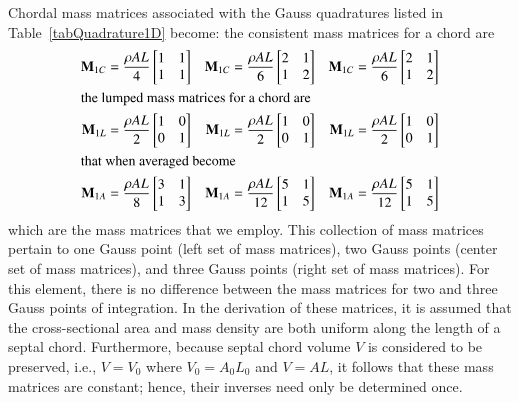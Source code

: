 Chordal mass matrices associated with the Gauss quadratures listed in Table~\ref{tabQuadrature1D} become: the consistent mass matrices for a chord are
\begin{subequations}
\label{massMatrices1D}
\begin{align}
    \mathbf{M}_{1C} & = \frac{\rho A L}{4} 
    \begin{bmatrix} 1 & 1 \\ 1 & 1 \end{bmatrix} & 
    \mathbf{M}_{1C} & = \frac{\rho A L}{6} 
    \begin{bmatrix} 2 & 1 \\ 1 & 2 \end{bmatrix} & 
    \mathbf{M}_{1C} & = \frac{\rho A L}{6} 
    \begin{bmatrix} 2 & 1 \\ 1 & 2 \end{bmatrix} 
    \label{ConsMassMatrix1D} \\
    \intertext{the lumped mass matrices for a chord are}
    \mathbf{M}_{1L} & = \frac{\rho A L}{2} 
    \begin{bmatrix} 1 & 0 \\ 0 & 1 \end{bmatrix} & 
    \mathbf{M}_{1L} & = \frac{\rho A L}{2} 
    \begin{bmatrix} 1 & 0 \\ 0 & 1 \end{bmatrix} & 
    \mathbf{M}_{1L} & = \frac{\rho A L}{2} 
    \begin{bmatrix} 1 & 0 \\ 0 & 1 \end{bmatrix} 
    \label{LumMassMatrix1D} \\
    \intertext{that when averaged become}
    \mathbf{M}_{1A} & = \frac{\rho A L}{8} 
    \begin{bmatrix} 3 & 1 \\ 1 & 3 \end{bmatrix} & 
    \mathbf{M}_{1A} & = \frac{\rho A L}{12} 
    \begin{bmatrix} 5 & 1 \\ 1 & 5 \end{bmatrix} & 
    \mathbf{M}_{1A} & = \frac{\rho A L}{12} 
    \begin{bmatrix} 5 & 1 \\ 1 & 5 \end{bmatrix}
    \label{avgMassMatrix1D}
\end{align}
\end{subequations}
which are the mass matrices that we employ.  This collection of mass matrices pertain to one Gauss point (left set of mass matrices), two Gauss points (center set of mass matrices), and three Gauss points (right set of mass matrices).  For this element, there is no difference between the mass matrices for two and three Gauss points of integration.  In the derivation of these matrices, it is assumed that the cross-sectional area and mass density  are both uniform along the length of a septal chord.  Furthermore, because septal chord volume $V$ is considered to be preserved, i.e., $V = V_0$ where $V_0 = A_0 L_0$ and $V = A L$, it follows that these mass matrices are constant; hence, their inverses need only be determined once.

